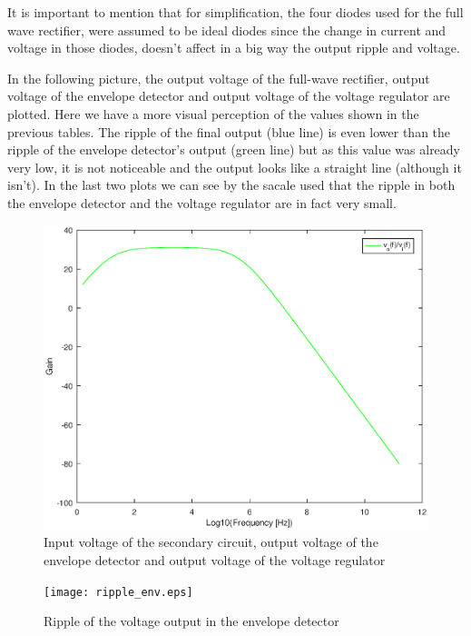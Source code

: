 \par It is important to mention that for simplification, the four diodes used for the full wave rectifier, were assumed to be ideal diodes since the change in current and voltage in those diodes, doesn't affect in a big way the output ripple and voltage. 

\par In the following picture, the output voltage of the full-wave rectifier, output voltage of the envelope detector and output voltage of the voltage regulator are plotted. Here we have a more visual perception of the values shown in the previous tables. The ripple of the final output (blue line) is even lower than the ripple of the envelope detector's output (green line) but as this value was already very low, it is not noticeable and the output looks like a straight line (although it isn't). In the last two plots we can see by the sacale used that the ripple in both the envelope detector and the voltage regulator are in fact very small.

\begin{figure}[H] \centering
\includegraphics[width=1\linewidth]{teoria.eps}
\caption{Input voltage of the secondary circuit, output voltage of the envelope detector and output voltage of the voltage regulator}
\end{figure}

\begin{figure}[H] \centering
\texttt{[image: ripple\_env.eps]}
\caption{Ripple of the voltage output in the envelope detector}
\end{figure}

